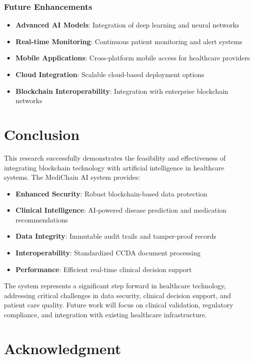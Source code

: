 \documentclass[conference]{IEEEtran}
\begin{document}
\subsubsection{Future Enhancements}
\begin{itemize}
    \item \textbf{Advanced AI Models}: Integration of deep learning and neural networks
    \item \textbf{Real-time Monitoring}: Continuous patient monitoring and alert systems
    \item \textbf{Mobile Applications}: Cross-platform mobile access for healthcare providers
    \item \textbf{Cloud Integration}: Scalable cloud-based deployment options
    \item \textbf{Blockchain Interoperability}: Integration with enterprise blockchain networks
\end{itemize}

\section{Conclusion}

This research successfully demonstrates the feasibility and effectiveness of integrating blockchain technology with artificial intelligence in healthcare systems. The MediChain AI system provides:

\begin{itemize}
    \item \textbf{Enhanced Security}: Robust blockchain-based data protection
    \item \textbf{Clinical Intelligence}: AI-powered disease prediction and medication recommendations
    \item \textbf{Data Integrity}: Immutable audit trails and tamper-proof records
    \item \textbf{Interoperability}: Standardized CCDA document processing
    \item \textbf{Performance}: Efficient real-time clinical decision support
\end{itemize}

The system represents a significant step forward in healthcare technology, addressing critical challenges in data security, clinical decision support, and patient care quality. Future work will focus on clinical validation, regulatory compliance, and integration with existing healthcare infrastructure.

\section{Acknowledgment}
\end{document}
